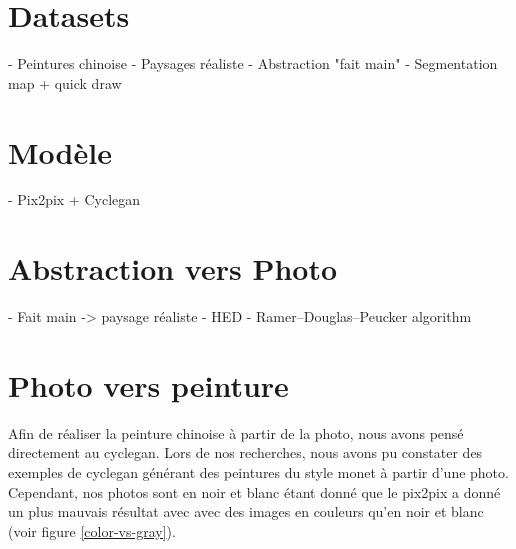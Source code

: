 \documentclass[a4paper, 12pt]{report}
\begin{document}
\section{Datasets}
- Peintures chinoise
- Paysages réaliste
- Abstraction "fait main"
- Segmentation map + quick draw

\section{Modèle}
- Pix2pix + Cyclegan

\section{Abstraction vers Photo}
- Fait main -> paysage réaliste
- HED
- Ramer–Douglas–Peucker algorithm

\section{Photo vers peinture}
Afin de réaliser la peinture chinoise à partir de la photo, nous avons pensé directement au cyclegan. Lors de nos recherches, nous avons pu constater des exemples de cyclegan générant des peintures du style monet à partir d'une photo. \\
Cependant, nos photos sont en noir et blanc étant donné que le pix2pix a donné un plus mauvais résultat avec avec des images en couleurs qu'en noir et blanc (voir figure \ref{color-vs-gray}).%
\end{document}
